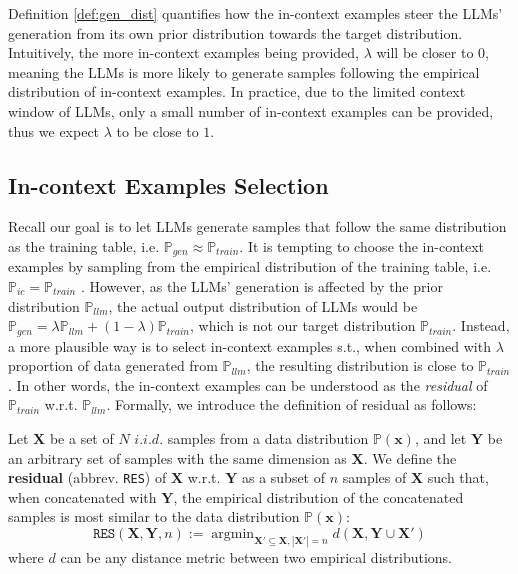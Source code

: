 Definition \ref{def:gen_dist} quantifies how the in-context examples steer the LLMs' generation from its own prior distribution towards the target distribution. Intuitively, the more in-context examples being provided, $\lambda$ will be closer to $0$, meaning the LLMs is more likely to generate samples following the empirical distribution of in-context examples. In practice, due to the limited context window of LLMs, only a small number of in-context examples can be provided, thus we expect $\lambda$ to be close to $1$. 

\subsection{In-context Examples Selection}
Recall our goal is to let LLMs generate samples that follow the same distribution as the training table, i.e. $\mathbb{P}_{gen} \approx \mathbb{P}_{train}$. It is tempting to choose the in-context examples by sampling from the empirical distribution of the training table, i.e. $\mathbb{P}_{ic} = \mathbb{P}_{train}$ \citep{cllm}. However, as the LLMs' generation is affected by the prior distribution $\mathbb{P}_{llm}$, the actual output distribution of LLMs would be $\mathbb{P}_{gen} = \lambda \mathbb{P}_{llm} + (1-\lambda) \mathbb{P}_{train}$, which is not our target distribution $\mathbb{P}_{train}$. Instead, a more plausible way is to select in-context examples s.t., when combined with $\lambda$ proportion of data generated from $\mathbb{P}_{llm}$, the resulting distribution is close to $\mathbb{P}_{train}$. In other words, the in-context examples can be understood as the \textit{residual} of $\mathbb{P}_{train}$ w.r.t. $\mathbb{P}_{llm}$. Formally, we introduce the definition of residual as follows:
\begin{definition}
Let $\boldsymbol{X}$ be a set of $N$ $i.i.d.$ samples from a data distribution $\mathbb{P}(\boldsymbol{x})$, and let $\boldsymbol{Y}$ be an arbitrary set of samples with the same dimension as $\boldsymbol{X}$. We define the \textbf{residual} (abbrev. \texttt{RES}) of $\boldsymbol{X}$ w.r.t. $\boldsymbol{Y}$ as a subset of $n$ samples of $\boldsymbol{X}$ such that, when concatenated with $\boldsymbol{Y}$, the empirical distribution of the concatenated samples is most similar to the data distribution $\mathbb{P}(\boldsymbol{x})$:
\begin{equation}
  \label{eq:residual}
  \texttt{RES}(\boldsymbol{X}, \boldsymbol{Y}, n) := \mathop{\arg\min}_{\boldsymbol{X}' \subseteq \boldsymbol{X}, |\boldsymbol{X}'| = n} d(\boldsymbol{X}, \boldsymbol{Y} \cup \boldsymbol{X}')
\end{equation}
where $d$ can be any distance metric between two empirical distributions.
\end{definition}

